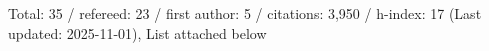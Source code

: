 Total: 35 / refereed: 23 / first author: 5 / citations: 3,950 / h-index: 17 (Last updated: 2025-11-01), List attached below